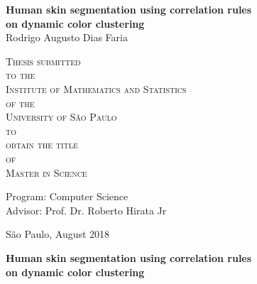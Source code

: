 \documentclass[12pt,twoside,a4paper]{book}
\theoremstyle{plain}
\theoremstyle{definition}
\begin{document}
\frontmatter 
\fancyhead[RO]{{\footnotesize\rightmark}\hspace{2em}\thepage}
\setcounter{tocdepth}{2}
\fancyhead[LE]{\thepage\hspace{2em}\footnotesize{\leftmark}}
\fancyhead[RE,LO]{}
\fancyhead[RO]{{\footnotesize\rightmark}\hspace{2em}\thepage}

\onehalfspacing  %

\thispagestyle{empty}
\begin{center}
    \vspace*{2.3cm}
    \textbf{\Large{Human skin segmentation using correlation rules\\ on dynamic color clustering}}\\
    
    \vspace*{1.2cm}
    \Large{Rodrigo Augusto Dias Faria}
    
    \vskip 2cm
    \textsc{
    Thesis submitted\\[-0.25cm] 
    to the\\[-0.25cm]
    Institute of Mathematics and Statistics\\[-0.25cm]
    of the\\[-0.25cm]
    University of São Paulo\\[-0.25cm]
    to\\[-0.25cm]
    obtain the title\\[-0.25cm]
    of\\[-0.25cm]
    Master in Science}
    
    \vskip 1.5cm
    Program: Computer Science\\
    Advisor: Prof. Dr. Roberto Hirata Jr

    
    \vskip 1.5cm %
    \normalsize{São Paulo, August 2018}
\end{center}

%
%
%
\newpage
\thispagestyle{empty}
    \begin{center}
        \vspace*{2.3 cm}
        \textbf{\Large{Human skin segmentation using correlation rules\\ on dynamic color clustering}}\\
        \vspace*{2 cm}
    \end{center}
\end{document}
